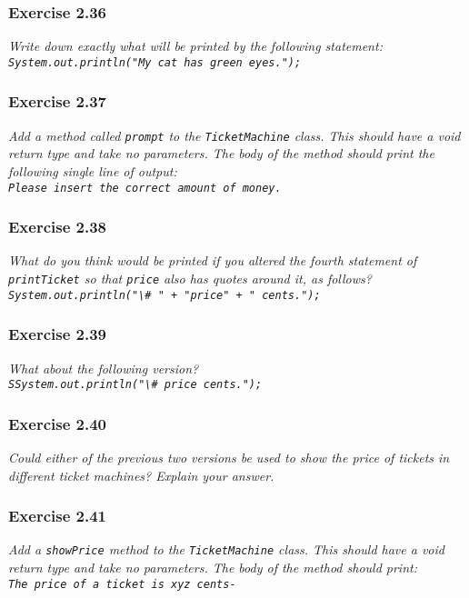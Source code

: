 \subsubsection*{Exercise 2.36}
\textit{Write down exactly what will be printed by the following statement: \\
\lstinline?System.out.println("My cat has green eyes.");?}

\subsubsection*{Exercise 2.37}
\textit{Add a method called \lstinline?prompt? to the \lstinline?TicketMachine? 
class. This should have a void return type and take no parameters. The body of 
the method should print the following single line of output: \\
\lstinline?Please insert the correct amount of money. ?}

\subsubsection*{Exercise 2.38}
\textit{What do you think would be printed if you altered the fourth statement 
of \lstinline?printTicket? so that \lstinline?price? also has quotes around it, 
as follows? \\
\lstinline?System.out.println("\# " + "price" + " cents.");?}

\subsubsection*{Exercise 2.39}
\textit{What about the following version? \\
\lstinline?SSystem.out.println("\# price cents.");?}

\subsubsection*{Exercise 2.40}
\textit{Could either of the previous two versions be used to show the price of 
tickets in different ticket machines? Explain your answer. }

\subsubsection*{Exercise 2.41}
\textit{Add a \lstinline?showPrice? method to the \lstinline?TicketMachine? 
class. This should have a void return type and take no parameters. The body of 
the method should print: \\
\lstinline?The price of a ticket is xyz cents- ?}

